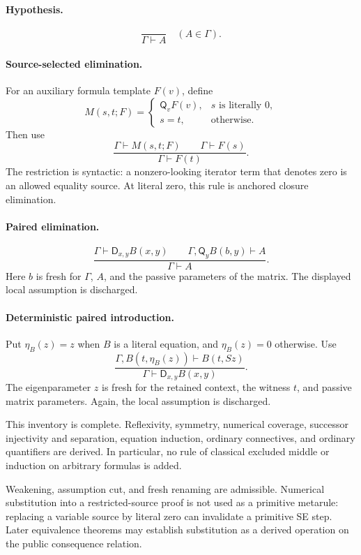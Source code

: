 \documentclass[11pt,letterpaper]{article}
\theoremstyle{definition}\newtheorem{definition}[theorem]{Definition}
\theoremstyle{remark}\newtheorem{remark}[theorem]{Remark}
\newcommand{\Q}{\mathsf Q}
\newcommand{\D}{\mathsf D}
\begin{document}
\paragraph{Hypothesis.}
\[
 \frac{}{\Gamma\vdash A}\quad(A\in\Gamma).
 \tag{Hyp}
\]

\paragraph{Source-selected elimination.}
For an auxiliary formula template $F(v)$, define
\[
 M(s,t;F)=
 \begin{cases}
  \Q_vF(v),&s\text{ is literally }0,\\
  s=t,&\text{otherwise}.
 \end{cases}
\]
Then use
\[
 \frac{\Gamma\vdash M(s,t;F)\qquad\Gamma\vdash F(s)}
      {\Gamma\vdash F(t)}.
 \tag{SE}\label{rule:se}
\]
The restriction is syntactic: a nonzero-looking iterator term that denotes
zero is an allowed equality source. At literal zero, this rule is anchored
closure elimination.

\paragraph{Paired elimination.}
\[
 \frac{\Gamma\vdash\D_{x,y}B(x,y)\qquad
       \Gamma,\Q_yB(b,y)\vdash A}
      {\Gamma\vdash A}.
 \tag{DE}\label{rule:de}
\]
Here $b$ is fresh for $\Gamma$, $A$, and the passive parameters of the
matrix. The displayed local assumption is discharged.

\paragraph{Deterministic paired introduction.}
Put $\eta_B(z)=z$ when $B$ is a literal equation, and $\eta_B(z)=0$
otherwise. Use
\[
 \frac{\Gamma,B(t,\eta_B(z))\vdash B(t,Sz)}
      {\Gamma\vdash\D_{x,y}B(x,y)}.
 \tag{DI}\label{rule:di}
\]
The eigenparameter $z$ is fresh for the retained context, the witness $t$,
and passive matrix parameters. Again, the local assumption is discharged.

This inventory is complete. Reflexivity, symmetry, numerical coverage,
successor injectivity and separation, equation induction, ordinary
connectives, and ordinary quantifiers are derived. In particular, no rule
of classical excluded middle or induction on arbitrary formulas is added.

Weakening, assumption cut, and fresh renaming are admissible. Numerical
substitution into a restricted-source proof is not used as a primitive
metarule: replacing a variable source by literal zero can invalidate a
primitive SE step. Later equivalence theorems may establish substitution
as a derived operation on the public consequence relation.
\end{document}
